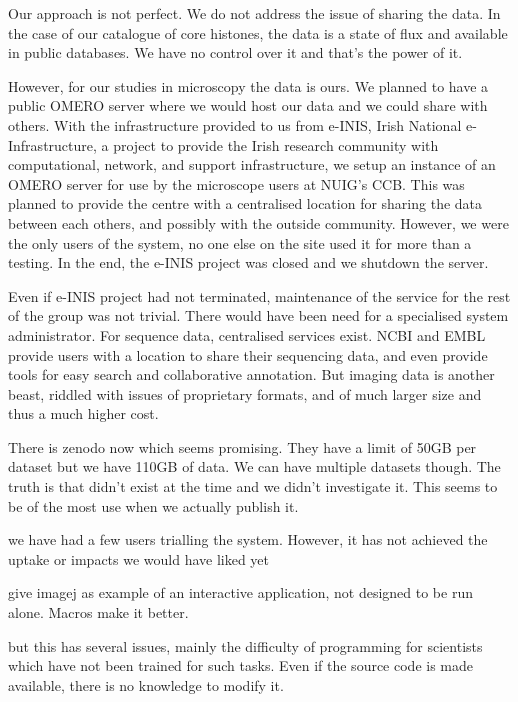 Our approach is not perfect.  We do not address the issue of sharing
the data.  In the case of our catalogue of core histones, the data is
a state of flux and available in public databases.  We have no control
over it and that's the power of it.

However, for our studies in microscopy the data is ours.  We planned
to have a public OMERO server where we would host our data and we
could share with others.  With the infrastructure provided to us from
e-INIS, Irish National e-Infrastructure, a project to provide the
Irish research community with computational, network, and support
infrastructure,  we setup an instance of an OMERO server for use by the
microscope users at NUIG's CCB.  This was planned to provide the
centre with a centralised location for sharing the data between each
others, and possibly with the outside community.  However, we were the
only users of the system, no one else on the site used it for more
than a testing.  In the end, the e-INIS project was closed and we
shutdown the server.

Even if e-INIS project had not terminated, maintenance of the service
for the rest of the group was not trivial.  There would have been need
for a specialised system administrator.  For sequence data,
centralised services exist.  NCBI and EMBL provide users with a
location to share their sequencing data, and even provide tools for
easy search and collaborative annotation.  But imaging data is another
beast, riddled with issues of proprietary formats, and of much larger
size and thus a much higher cost.

There is zenodo now which seems promising.  They have a limit of 50GB
per dataset but we have 110GB of data.  We can have multiple datasets
though.  The truth is that didn't exist at the time and we didn't
investigate it.  This seems to be of the most use when we actually
publish it.



we have had a
few users trialling the system. However, it has not achieved the
uptake or impacts we would have liked yet




give imagej as example of an interactive application, not designed to
be run alone. Macros make it better.


  but this has several issues, mainly the difficulty of programming
  for scientists which have not been trained for such tasks. Even if
  the source code is made available, there is no knowledge to modify it.


